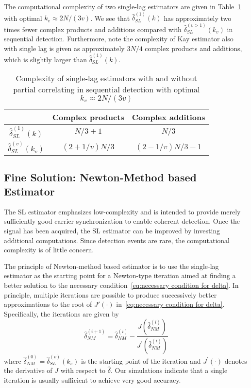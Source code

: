 The  computational complexity of two single-lag estimators are given
in Table~\ref{table:computational complexity comparison} with optimal $k_v \approx 2N/(3v)$. 
We see that $\hat{\delta}_{SL}^{(1)}(k)$ has approximately two times
fewer complex products and additions compared with
$\hat{\delta}_{SL}^{(v>1)}(k_v)$ in sequential detection. 
Furthermore, note the complexity of Kay estimator also with single lag
is given as approximately $3N/4$ complex products and additions, 
which is slightly larger than $\hat{\delta}_{SL}^{(1)}(k)$.

\begin{table}[t]
  \caption{Complexity of single-lag estimators with and without partial correlating in sequential detection with optimal $k_v\approx2N/(3v)$}  %
  \centering 
  \begin{tabular}{c c c} 
  \hline\hline 
   & Complex products & Complex additions \\ [0.5ex] 
  \hline 
  $\hat{\delta}_{SL}^{(1)}(k)$  & $N/3+1$ & $N/3$ \\ 
  $\hat{\delta}_{SL}^{(v)}(k_v)$ & $(2+1/v) N/3$ & $(2-1/v)N/3-1$ \\ [1ex]
  \hline
  \end{tabular}
  \label{table:computational complexity comparison}
\end{table}

\subsection{Fine Solution: Newton-Method based Estimator}

The SL estimator emphasizes low-complexity  and is intended
to provide merely sufficiently good carrier synchronization to enable coherent detection.
Once the signal has been acquired, the SL estimator can be improved by 
investing additional computations. Since detection events are rare, the computational
complexity is of little concern.

The principle of Newton-method based estimator is to use the
single-lag estimator as the starting point for a Newton-type iteration  
aimed at finding a better solution to the necessary condition~\eqref{eq:necessary condition for delta}. 
In principle, multiple iterations are possible to produce successively better approximations to the root of
$J'(\cdot)$ in~\eqref{eq:necessary condition for delta}.
Specifically, the iterations are given by
\begin{equation}
  \label{eq:iter_NM_est}
  \hat{\delta}_{NM}^{(i+1)}=\hat{\delta}_{NM}^{(i)}-
  \frac{J(\hat{\delta}_{NM}^{(i)})}{J^\prime(\hat{\delta}_{NM}^{(i)})}
\end{equation}
where $\hat{\delta}_{NM}^{(0)}=\hat{\delta}^{(v)}_{SL}(k_v)$ is the
starting point of the iteration and
$J^\prime(\cdot)$ denotes the derivative of $J$ with respect to $\hat{\delta}$. 
Our simulations indicate that  a single iteration is usually sufficient to achieve very good accuracy.

